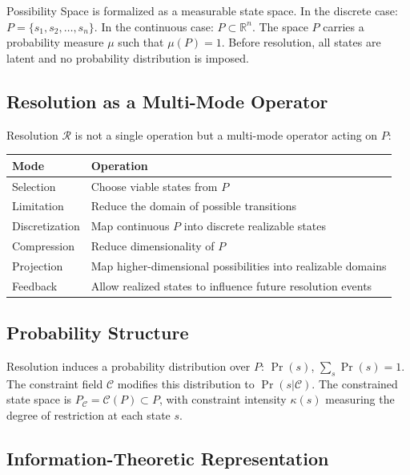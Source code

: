 \documentclass[12pt, a4paper]{article}
\begin{document}
Possibility Space is formalized as a measurable state space. In the discrete case:
$P = \{s_1, s_2, \ldots, s_n\}$. In the continuous case: $P \subset \mathbb{R}^n$.
The space $P$ carries a probability measure $\mu$ such that $\mu(P) = 1$. Before
resolution, all states are latent and no probability distribution is imposed.

\subsection{Resolution as a Multi-Mode Operator}

Resolution $\mathcal{R}$ is not a single operation but a multi-mode operator acting on $P$:

\begin{center}
\renewcommand{\arraystretch}{1.2}
\begin{tabular}{ll}
\toprule
\textbf{Mode} & \textbf{Operation} \\
\midrule
Selection & Choose viable states from $P$ \\
Limitation & Reduce the domain of possible transitions \\
Discretization & Map continuous $P$ into discrete realizable states \\
Compression & Reduce dimensionality of $P$ \\
Projection & Map higher-dimensional possibilities into realizable domains \\
Feedback & Allow realized states to influence future resolution events \\
\bottomrule
\end{tabular}
\end{center}

\subsection{Probability Structure}

Resolution induces a probability distribution over $P$: $\Pr(s)$, $\sum_s \Pr(s) = 1$.
The constraint field $\mathcal{C}$ modifies this distribution to $\Pr(s|\mathcal{C})$.
The constrained state space is $P_\mathcal{C} = \mathcal{C}(P) \subset P$, with
constraint intensity $\kappa(s)$ measuring the degree of restriction at each state $s$.

\subsection{Information-Theoretic Representation}
\end{document}
